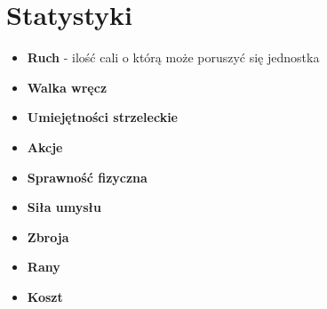 \chapter{Statystyki}

\begin{itemize}
	\item \textbf{Ruch} - ilość cali o którą może poruszyć się jednostka 
	\item \textbf{Walka wręcz}
	\item \textbf{Umiejętności strzeleckie}
	\item \textbf{Akcje}
	\item \textbf{Sprawność fizyczna}
	\item \textbf{Siła umysłu}
	\item \textbf{Zbroja}
	\item \textbf{Rany}
	\item \textbf{Koszt}
	
\end{itemize}